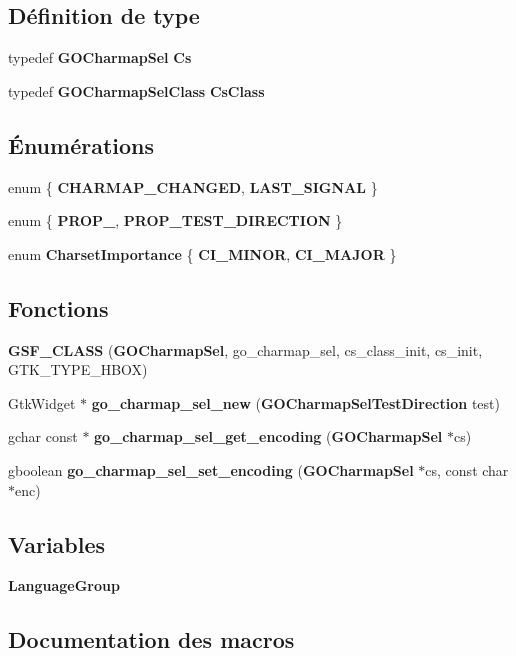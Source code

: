 \subsection*{Définition de type}
\begin{DoxyCompactItemize}
\item 
typedef {\bf GOCharmapSel} {\bf Cs}
\item 
typedef {\bf GOCharmapSelClass} {\bf CsClass}
\end{DoxyCompactItemize}
\subsection*{Énumérations}
\begin{DoxyCompactItemize}
\item 
enum \{ {\bf CHARMAP\_\-CHANGED}, 
{\bf LAST\_\-SIGNAL}
 \}
\item 
enum \{ {\bf PROP\_}, 
{\bf PROP\_\-TEST\_\-DIRECTION}
 \}
\item 
enum {\bf CharsetImportance} \{ {\bf CI\_\-MINOR}, 
{\bf CI\_\-MAJOR}
 \}
\end{DoxyCompactItemize}
\subsection*{Fonctions}
\begin{DoxyCompactItemize}
\item 
{\bf GSF\_\-CLASS} ({\bf GOCharmapSel}, go\_\-charmap\_\-sel, cs\_\-class\_\-init, cs\_\-init, GTK\_\-TYPE\_\-HBOX)
\item 
GtkWidget $\ast$ {\bf go\_\-charmap\_\-sel\_\-new} ({\bf GOCharmapSelTestDirection} test)
\item 
gchar const $\ast$ {\bf go\_\-charmap\_\-sel\_\-get\_\-encoding} ({\bf GOCharmapSel} $\ast$cs)
\item 
gboolean {\bf go\_\-charmap\_\-sel\_\-set\_\-encoding} ({\bf GOCharmapSel} $\ast$cs, const char $\ast$enc)
\end{DoxyCompactItemize}
\subsection*{Variables}
\begin{DoxyCompactItemize}
\item 
{\bf LanguageGroup}
\end{DoxyCompactItemize}


\subsection{Documentation des macros}
